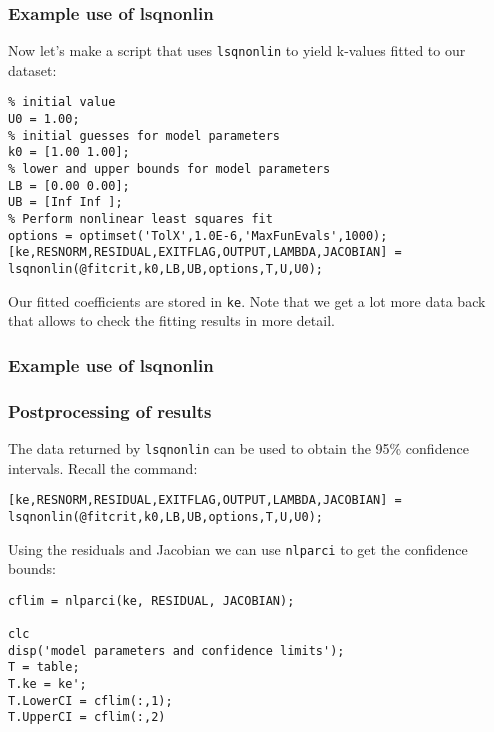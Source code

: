 \begin{frame}[fragile] 
  \frametitle{Example use of lsqnonlin}
  Now let's make a script that uses \lstinline$lsqnonlin$ to yield k-values fitted to our dataset:
  \pause
  \begin{lstlisting}
% initial value
U0 = 1.00;
% initial guesses for model parameters
k0 = [1.00 1.00];
% lower and upper bounds for model parameters
LB = [0.00 0.00];
UB = [Inf Inf ];
% Perform nonlinear least squares fit
options = optimset('TolX',1.0E-6,'MaxFunEvals',1000);
[ke,RESNORM,RESIDUAL,EXITFLAG,OUTPUT,LAMBDA,JACOBIAN] = lsqnonlin(@fitcrit,k0,LB,UB,options,T,U,U0);
    \end{lstlisting}
    Our fitted coefficients are stored in \lstinline$ke$. Note that we get a lot more data back that allows to check the fitting results in more detail.
\end{frame}

\begin{frame}[fragile] 
  \frametitle{Example use of lsqnonlin}
  \centering
\end{frame}

\begin{frame}[fragile] 
  \frametitle{Postprocessing of results}
  The data returned by \lstinline{lsqnonlin} can be used to obtain the 95\% confidence intervals. Recall the command:
  \begin{lstlisting}
[ke,RESNORM,RESIDUAL,EXITFLAG,OUTPUT,LAMBDA,JACOBIAN] = lsqnonlin(@fitcrit,k0,LB,UB,options,T,U,U0);
  \end{lstlisting}
    Using the residuals and Jacobian we can use \lstinline{nlparci} to get the confidence bounds:
    \begin{lstlisting}
cflim = nlparci(ke, RESIDUAL, JACOBIAN);

clc
disp('model parameters and confidence limits');
T = table;
T.ke = ke';
T.LowerCI = cflim(:,1);
T.UpperCI = cflim(:,2)\end{lstlisting}
\end{frame}




